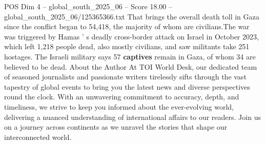 \begin{textsample}{POS Dim 4 – global\_south\_2025\_06 – Score 18.00 – global\_south\_2025\_06/125365366.txt}
That brings the overall death toll in Gaza since the conflict began to 54,418, the majority of whom are civilians.The war was triggered by Hamas ' s deadly cross-border attack on Israel in October 2023, which left 1,218 people dead, also mostly civilians, and saw militants take 251 hostages.
The Israeli military says 57 \textbf{captives} remain in Gaza, of whom 34 are believed to be dead.
About the Author At TOI World Desk, our dedicated team of seasoned journalists and passionate writers tirelessly sifts through the vast tapestry of global events to bring you the latest news and diverse perspectives round the clock.
With an unwavering commitment to accuracy, depth, and timeliness, we strive to keep you informed about the ever-evolving world, delivering a nuanced understanding of international affairs to our readers.
Join us on a journey across continents as we unravel the stories that shape our interconnected world.

\end{textsample}
